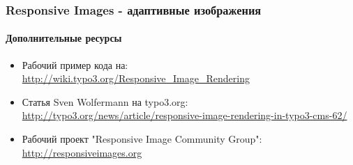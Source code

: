 
\begin{frame}[fragile]
	\frametitle{Responsive Images - адаптивные изображения}
	\framesubtitle{Дополнительные ресурсы}

	\begin{itemize}
		\item Рабочий пример кода на:\newline
			\small\url{http://wiki.typo3.org/Responsive_Image_Rendering}\normalsize

		\item Статья Sven Wolfermann на typo3.org:\newline
			\small\url{http://typo3.org/news/article/responsive-image-rendering-in-typo3-cms-62/}\normalsize

		\item Рабочий проект "Responsive Image Community Group":\newline
			\small\url{http://responsiveimages.org}\normalsize

	\end{itemize}

\end{frame}


